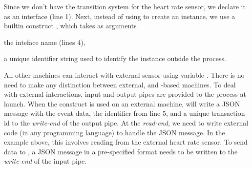 Since we don't have the transition system for
the heart rate sensor, we declare it as an interface (line 1).
Next, instead of using  to create an instance, we use
a builtin \MediK{} construct , which takes as
arguments
\begin{enumerate*}[label=(\alph*)]
  \item the inteface name (lines 4),
  \item a unique identifier string used to identify the
    instance outside the \MediK{} process.
\end{enumerate*}
All other \MediK{} machines can interact with external sensor using
variable . There is no need to make any distinction
between external, and \MediK{}-based machines.
To deal with external interactions, input and output
pipes are provided to the \MediK{} process at launch.
When the  construct is used on an external machine,
\MediK{} will write
a JSON \cite{jsonUrl} message with the event data, the
identifier from line 5, and a unique transaction id
to the \emph{write-end} of the output pipe. At the
\emph{read-end}, we need to write external code (in any programming language)
to handle the JSON message. In the example above, this involves reading from
the external heart rate sensor. To send data to \MediK{}, a JSON message in
a pre-specified format needs to be written to the \emph{write-end} of the
input pipe.

%
%


